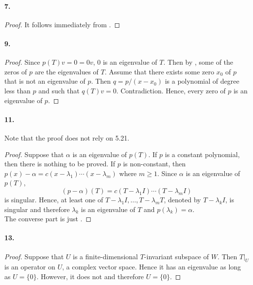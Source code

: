   \paragraph{7.}
  \begin{proof}
    It follows immediately from .
  \end{proof}

  \paragraph{9.}
  \begin{proof}
    Since $p(T)v=0=0v$, $0$ is an eigenvalue of $T$. Then by 
    , some of the zeros of $p$ are the 
    eigenvalues of $T$. Assume that there exists some zero $x_0$ of $p$ that is
    not an eigenvalue of $p$. Then $q=p/(x-x_0)$ is a polynomial of degree less
    than $p$ and such that $q(T)v=0$. Contradiction. Hence, every zero of $p$ is
    an eigenvalue of $p$.
  \end{proof}

  \paragraph{11.}
    Note that the proof does not rely on 5.21.
  \begin{proof}
    Suppose that $\alpha$ is an eigenvalue of $p(T)$. If $p$ is a constant 
    polynomial, then there is nothing to be proved. If $p$ is non-constant, then
    $p(x)-\alpha = c(x-\lambda_1)\cdots(x-\lambda_m)$ where $m\ge 1$. Since 
    $\alpha$ is an eigenvalue of $p(T)$, 
    \[
      (p-\alpha)(T)=c(T-\lambda_1 I)\cdots(T-\lambda_m I)
    \]
    is singular. Hence, at least one of $T-\lambda_1 I,\dots,T-\lambda_m T$, 
    denoted by $T-\lambda_k I$, is singular and therefore $\lambda_k$ is an 
    eigenvalue of $T$ and $p(\lambda_k)=\alpha$. \\
    The converse part is just .
  \end{proof}

  \paragraph{13.}
  \begin{proof}
    Suppose that $U$ is a finite-dimensional $T$-invariant subspace of $W$. Then
    $T|_U$ is an operator on $U$, a complex vector space. Hence it has an 
    eigenvalue as long as $U=\{0\}$. However, it does not and therefore $U = 
    \{0\}$.
  \end{proof}

